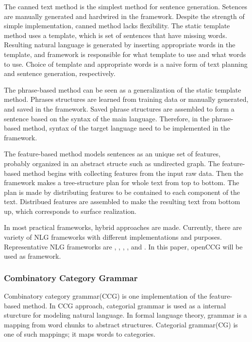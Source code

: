 \documentclass[11pt,letterpaper]{article}
\begin{document}
The canned text method is the simplest method for sentence generation. Setences are manually generated and hardwired in the framework. Despite the strength of simple implementation, canned method lacks flexibility. The static template method uses a template, which is set of sentences that have missing words. Resulting natural language is generated by inserting appropriate words in the template, and framework is responsible for what template to use and what words to use. Choice of template and appropriate words is a naive form of text planning and sentence generation, respectively. 

The phrase-based method can be seen as a generalization of the static template method. Phrases structures are learned from training data or manually generated, and saved in the framework. Saved phrase structures are assembled to form a sentence based on the syntax of the main language. Therefore, in the phrase-based method, syntax of the target language need to be implemented in the framework. 

The feature-based method models sentences as an unique set of features, probably organized in an abstract structe such as undirected graph. The feature-based method begins with collecting features from the input raw data. Then the framework makes a tree-structure plan for whole text from top to bottom. The plan is made by distributing features to be contained to each component of the text. Distribued features are assembled to make the resulting text from bottom up, which corresponds to surface realization. 

In most practical frameworks, hybrid approaches are made. Currently, there are variety of NLG frameworks with different implementations and purposes. Representative NLG frameworks are \cite{geni}, \cite{kpml}, \cite{clint}, \cite{naturalowl}, and \cite{openccg}. In this paper, openCCG will be used as framework. 


\subsubsection{Combinatory Category Grammar} 

Combinatory category grammar(CCG) is one implementation of the feature-based method. In CCG approach, categorial grammar is used as a internal sturcture for modeling natural language. In formal language theory, grammar is a mapping from word chunks to abstract structures. Categorial grammar(CG) is one of such mappings; it maps words to categories. 
\end{document}
